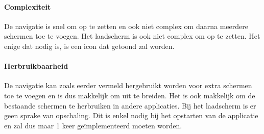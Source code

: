 \paragraph{Complexiteit}
De navigatie is snel om op te zetten en ook niet complex om daarna meerdere schermen toe te voegen. 
Het laadscherm is ook niet complex om op te zetten. Het enige dat nodig is, is een icon dat getoond zal worden.

\paragraph{Herbruikbaarheid}
De navigatie kan zoals eerder vermeld hergebruikt worden voor extra schermen toe te voegen en is dus makkelijk 
om uit te breiden. Het is ook makkelijk om de bestaande schermen te herbruiken in andere applicaties. 
Bij het laadscherm is er geen sprake van opschaling. Dit is enkel nodig bij het opstarten 
van de applicatie en zal dus maar 1 keer geïmplementeerd moeten worden.
